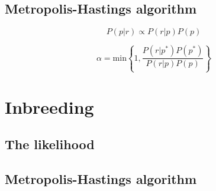\documentclass[11pt,english,letterpaper,oneside]{article}
\begin{document}
\subsection{Metropolis-Hastings algorithm}

\begin{equation}
P(p|r) \propto P(r|p)P(p)
\end{equation}

\begin{equation}
\alpha = \text{min} \left\{1, \frac{P(r|p^*)P(p^*)}{P(r|p)P(p)} \right\}
\end{equation}

\section{Inbreeding}

\subsection{The likelihood}

\subsection{Metropolis-Hastings algorithm}
\end{document}

